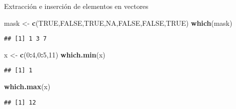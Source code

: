 \documentclass[ignorenonframetext,]{beamer}
\newenvironment{Shaded}{\begin{snugshade}}{\end{snugshade}}
\newcommand{\KeywordTok}[1]{\textcolor[rgb]{0.13,0.29,0.53}{\textbf{#1}}}
\newcommand{\DecValTok}[1]{\textcolor[rgb]{0.00,0.00,0.81}{#1}}
\newcommand{\StringTok}[1]{\textcolor[rgb]{0.31,0.60,0.02}{#1}}
\newcommand{\OtherTok}[1]{\textcolor[rgb]{0.56,0.35,0.01}{#1}}
\newcommand{\OperatorTok}[1]{\textcolor[rgb]{0.81,0.36,0.00}{\textbf{#1}}}
\newcommand{\NormalTok}[1]{#1}
\begin{document}
\begin{frame}[fragile]{Extracción e inserción de elementos en vectores}

\begin{Shaded}
\begin{Highlighting}[]
\NormalTok{mask <-}\StringTok{ }\KeywordTok{c}\NormalTok{(}\OtherTok{TRUE}\NormalTok{,}\OtherTok{FALSE}\NormalTok{,}\OtherTok{TRUE}\NormalTok{,}\OtherTok{NA}\NormalTok{,}\OtherTok{FALSE}\NormalTok{,}\OtherTok{FALSE}\NormalTok{,}\OtherTok{TRUE}\NormalTok{)}
\KeywordTok{which}\NormalTok{(mask)}
\end{Highlighting}
\end{Shaded}
\pause
\begin{verbatim}
## [1] 1 3 7
\end{verbatim}

\begin{Shaded}
\begin{Highlighting}[]
\NormalTok{x <-}\StringTok{ }\KeywordTok{c}\NormalTok{(}\DecValTok{0}\OperatorTok{:}\DecValTok{4}\NormalTok{,}\DecValTok{0}\OperatorTok{:}\DecValTok{5}\NormalTok{,}\DecValTok{11}\NormalTok{)}
\KeywordTok{which.min}\NormalTok{(x)}
\end{Highlighting}
\end{Shaded}
\pause
\begin{verbatim}
## [1] 1
\end{verbatim}

\begin{Shaded}
\begin{Highlighting}[]
\KeywordTok{which.max}\NormalTok{(x)}
\end{Highlighting}
\end{Shaded}
\pause
\begin{verbatim}
## [1] 12
\end{verbatim}

\end{frame}
\end{document}
